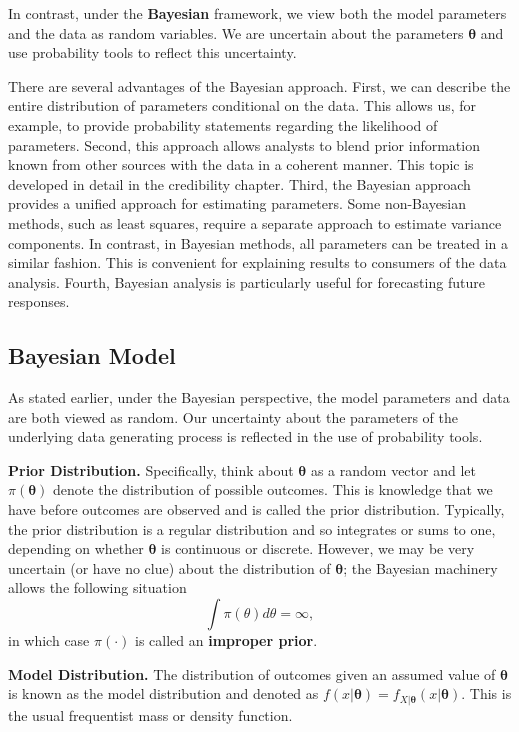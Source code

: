 \documentclass[]{book}
\theoremstyle{definition}
\theoremstyle{definition}
\theoremstyle{definition}
\theoremstyle{remark}
\begin{document}
In contrast, under the \textbf{Bayesian} framework, we view both the
model parameters and the data as random variables. We are uncertain
about the parameters \(\boldsymbol \theta\) and use probability tools to
reflect this uncertainty.

There are several advantages of the Bayesian approach. First, we can
describe the entire distribution of parameters conditional on the data.
This allows us, for example, to provide probability statements regarding
the likelihood of parameters. Second, this approach allows analysts to
blend prior information known from other sources with the data in a
coherent manner. This topic is developed in detail in the credibility
chapter. Third, the Bayesian approach provides a unified approach for
estimating parameters. Some non-Bayesian methods, such as least squares,
require a separate approach to estimate variance components. In
contrast, in Bayesian methods, all parameters can be treated in a
similar fashion. This is convenient for explaining results to consumers
of the data analysis. Fourth, Bayesian analysis is particularly useful
for forecasting future responses.

\subsection{Bayesian Model}\label{bayesian-model}

As stated earlier, under the Bayesian perspective, the model parameters
and data are both viewed as random. Our uncertainty about the parameters
of the underlying data generating process is reflected in the use of
probability tools.

\textbf{Prior Distribution.} Specifically, think about
\(\boldsymbol \theta\) as a random vector and let
\(\pi(\boldsymbol \theta)\) denote the distribution of possible
outcomes. This is knowledge that we have before outcomes are observed
and is called the prior distribution. Typically, the prior distribution
is a regular distribution and so integrates or sums to one, depending on
whether \(\boldsymbol \theta\) is continuous or discrete. However, we
may be very uncertain (or have no clue) about the distribution of
\(\boldsymbol \theta\); the Bayesian machinery allows the following
situation \[\int \pi(\theta) d\theta = \infty,\] in which case
\(\pi(\cdot)\) is called an \textbf{improper prior}.

\textbf{Model Distribution.} The distribution of outcomes given an
assumed value of \(\boldsymbol \theta\) is known as the model
distribution and denoted as
\(f(x | \boldsymbol \theta) = f_{X|\boldsymbol \theta} (x|\boldsymbol \theta )\).
This is the usual frequentist mass or density function.
\end{document}
